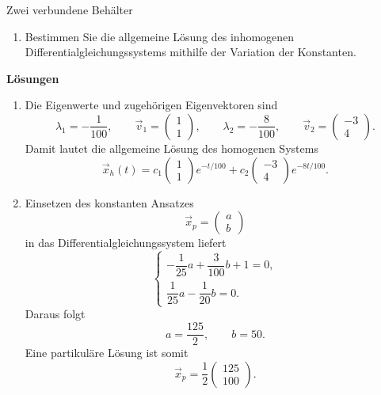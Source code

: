 \begin{ueb}{Zwei verbundene Behälter}{}
\begin{enumerate}
              Setzen Sie \(\vec{x}_p\) in das
              Differentialgleichungssystem ein und bestimmen Sie
              die beiden Zahlen \(a\) und \(b\).

              Wie lautet die Lösung des Differentialgleichungssystems
              unter Berücksichtigung der Anfangsbedingungen?

        \item Bestimmen Sie die allgemeine Lösung des inhomogenen
              Differentialgleichungssystems mithilfe der
              Variation der Konstanten.
    \end{enumerate}

\end{ueb}
\clearpage
\textbf{Lösungen}
\begin{enumerate}
    \item Die Eigenwerte und zugehörigen Eigenvektoren sind
          \[
              \lambda_1=-\frac{1}{100},
              \qquad
              \vec v_1=\begin{pmatrix}1\\1\end{pmatrix},
              \qquad
              \lambda_2=-\frac{8}{100},
              \qquad
              \vec v_2=\begin{pmatrix}-3\\4\end{pmatrix}.
          \]
          Damit lautet die allgemeine Lösung des homogenen Systems
          \[
              \boxed{
                  \vec x_h(t)
                  =c_1\begin{pmatrix}1\\1\end{pmatrix}e^{-t/100}
                  +c_2\begin{pmatrix}-3\\4\end{pmatrix}e^{-8t/100}.
              }
          \]

    \item Einsetzen des konstanten Ansatzes
          \[
              \vec x_p=\begin{pmatrix}a\\b\end{pmatrix}
          \]
          in das Differentialgleichungssystem liefert
          \[
              \begin{cases}
                  -\dfrac{1}{25}a+\dfrac{3}{100}b+1=0, \\[2mm]
                  \dfrac{1}{25}a-\dfrac{1}{20}b=0.
              \end{cases}
          \]
          Daraus folgt
          \[
              a=\frac{125}{2},
              \qquad b=50.
          \]
          Eine partikuläre Lösung ist somit
          \[
              \vec x_p=\frac12\begin{pmatrix}125\\100\end{pmatrix}.
          \]


\end{enumerate}
